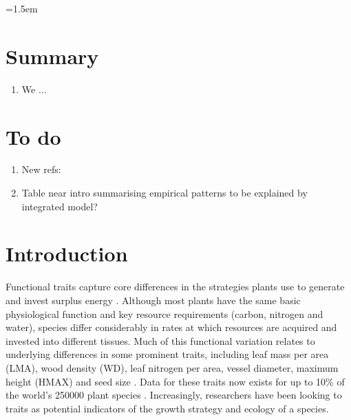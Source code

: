 \documentclass[a4paper,11pt]{article}
\date{}
\begin{document}
\mstitlepage
\noindent
\parindent=1.5em
\addtolength{\parskip}{.3em}
\section{Summary}
\begin{enumerate}
\def\labelenumi{\arabic{enumi}.}
\item We ...
\end{enumerate}



\section{To do}

\begin{enumerate}
\def\labelenumi{\arabic{enumi}.}
\item New refs: \citep{Ishihara-2016, Duursma-2016, Gibert-2016, Falster-2016, Kunstler-2015,Falster-2015b, Falster-2015a,Wenk-2015,Li-2014}
\item Table near intro summarising empirical patterns to be explained by integrated model?
\end{enumerate}

\section{Introduction}

Functional traits capture core differences in the strategies
plants use to generate and invest surplus energy
 \citep{Wright-2004, Chave-2009, Westoby-2002}.
Although most plants have the same basic physiological function
and key resource requirements (carbon, nitrogen and water), species differ considerably in
rates at which resources are acquired and invested into different tissues.
Much of this functional variation relates to underlying
differences in some prominent traits, including leaf
mass per area (LMA), wood density (WD), leaf nitrogen per area, vessel
diameter,  maximum  height (HMAX) and seed size  \citep{Wright-2004, Chave-2009}.
Data for these traits now exists for up to 10\% of the world's 250000 plant species
\citep{Cornwell-2014}. Increasingly, researchers have been looking to traits
as potential indicators of the growth strategy and ecology of a species.
\end{document}
